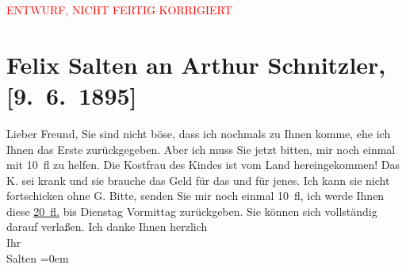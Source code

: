 
\begin{center}
            \textcolor{red}{ENTWURF, NICHT FERTIG KORRIGIERT}
                      \end{center}
            
         
         \renewcommand{\erwaehntePersonen}{Personen:  ?? [Kostfrau von Charlotte Lamberg], Maria Charlotte Lamberg}
         \renewcommand{\erwaehnteOrte}{Orte: Wien}
         \renewcommand{\erwaehnteWerke}{}
               \section[Felix Salten an Arthur Schnitzler, {[}9. 6. 1895{]}]{ Felix Salten an Arthur Schnitzler, {[}9. 6. 1895{]}}\nopagebreak{}\rehead{ }\begin{ledgroupsized}[t]{13cm}\normalsize\beginnumbering \toendnotes[C]{\smallbreak\pagebreak[2]} 
\toendnotes[C]{\smallbreak}\pstart
           \noindent{}{\pb}Lieber Freund, Sie sind nicht böse, dass ich nochmals zu Ihnen
               komme, ehe ich Ihnen das Erste zurückgegeben. Aber ich muss Sie jetzt bitten, mir
               noch einmal mit 10 fl zu helfen. Die Kostfrau des Kindes ist vom Land hereingekommen! Das K. sei krank und sie brauche das Geld für
               das und für jenes. Ich kann sie nicht fortschicken ohne G. Bitte, senden Sie mir noch
               einmal 10 fl, ich {\pb}werde Ihnen
               diese \uline{20 fl.} bis Dienstag Vormittag  zurückgeben. Sie können sich vollständig
               darauf verlaßen. Ich danke Ihnen \pend
           \pstart
           herzlich {\\[\baselineskip]}Ihr {\\[\baselineskip]}\spacefill\mbox{Salten}\pend
           \leftskip=0em{}
         
         \endnumbering{}\end{ledgroupsized}\begin{anhang}\end{anhang}\newcommand{\dateiname}{L03156}\newcommand{\titel}{Felix Salten an Arthur Schnitzler, [9. 6. 1895]}\newcommand{\editorInnen}{Martin Anton Müller und Laura Untner}
      